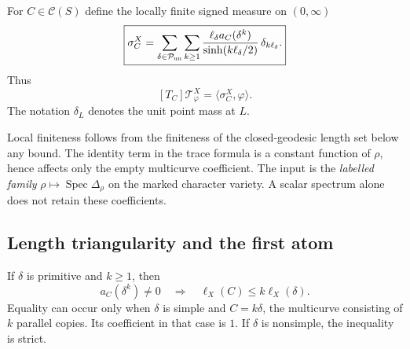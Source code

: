 \begin{definition}
For $C\in\mathscr C(S)$ define the locally finite signed measure
on $(0,\infty)$
\begin{equation}
 \boxed{
 \sigma_C^X
 =\sum_{\delta\in\mathcal P_{\rm un}}\sum_{k\geq1}
   \frac{\ell_\delta a_C(\delta^k)}
        {\sinh(k\ell_\delta/2)}\,\delta_{k\ell_\delta}.
 }
 \label{eq:coeffdistribution}
\end{equation}
Thus
\[
 [T_C]\mathscr T^X_\varphi=\langle\sigma_C^X,\varphi\rangle.
\]
The notation $\delta_L$ denotes the unit point mass at $L$.
\end{definition}

Local finiteness follows from the finiteness of the closed-geodesic
length set below any bound. The identity term in the trace formula
is a constant function of $\rho$, hence affects only the empty
multicurve coefficient. The input is the \emph{labelled family}
$\rho\mapsto\operatorname{Spec}\Delta_\rho$ on the marked character
variety. A scalar spectrum alone does not retain these coefficients.

\subsection{Length triangularity and the first atom}

\begin{lemma}
\label{lem:coefftriangularity}
If $\delta$ is primitive and $k\geq1$, then
\[
 a_C(\delta^k)\neq0\quad\Longrightarrow\quad
 \ell_X(C)\leq k\ell_X(\delta).
\]
Equality can occur only when $\delta$ is simple and $C=k\delta$,
the multicurve consisting of $k$ parallel copies. Its coefficient
in that case is $1$. If $\delta$ is nonsimple, the inequality is strict.
\end{lemma}

